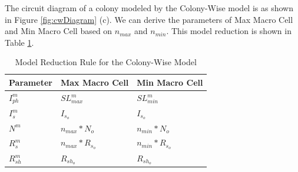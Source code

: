 The circuit diagram of a colony modeled by the Colony-Wise model is as shown in Figure \ref{fig:cwDiagram} (c). We can derive the parameters of Max Macro Cell and Min Macro Cell based on $n_{max}$ and $n_{min}$. This model reduction is shown in Table \ref{table:cwRule}.

\begin{table}[tb]
  \caption{Model Reduction Rule for the Colony-Wise Model }
  \label{table:cwRule}
  \centering
  \normalsize
\begin{tabular}{|l|l|l|}
  \hline
  Parameter & Max Macro Cell & Min Macro Cell \\
  \hline
  $I_{ph}^m$ & $SL_{max}^m$ & $SL_{min}^m$ \\
  \hline
  $I_s^m$ & $I_{s_o}$ & $I_{s_o}$ \\
  \hline
  $N^m$ & $n_{max}*N_o$ & $n_{min}*N_o$ \\
  \hline
  $R_s^m$ & $n_{max}*R_{s_o}$ & $n_{min}*R_{s_o}$ \\
  \hline
  $R_{sh}^m$ & $R_{sh_o}$ & $R_{sh_o}$ \\
  \hline
\end{tabular}
\end{table}




